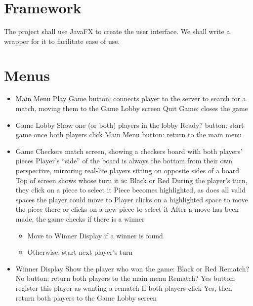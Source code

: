 \documentclass{scrreprt}
\begin{document}
\section{Framework}

The project shall use JavaFX to create the user interface. We shall write a wrapper for it to facilitate ease of use.

\section{Menus}

\begin{itemize}
\item Main Menu
    \subitem Play Game button: connects player to the server to search for a match, moving them to the Game Lobby screen
    \subitem Quit Game: closes the game

\item Game Lobby
    \subitem Show one (or both) players in the lobby
    \subitem Ready? button: start game once both players click
    \subitem Main Menu button: return to the main menu

\item Game
    \subitem Checkers match screen, showing a checkers board with both players’ pieces
        \subsubitem Player’s “side” of the board is always the bottom from their own perspective, mirroring real-life players sitting on opposite sides of a board
    \subitem Top of screen shows whose turn it is: Black or Red
        \subsubitem During the player’s turn, they click on a piece to select it
        \subsubitem Piece becomes highlighted, as does all valid spaces the player could move to
        \subsubitem Player clicks on a highlighted space to move the piece there or clicks on a new piece to select it
        \subsubitem After a move has been made, the game checks if there is a winner
        \subsubitem \begin{itemize}
            \item Move to Winner Display if a winner is found
            \item Otherwise, start next player’s turn
        \end{itemize}

\item Winner Display
    \subitem Show the player who won the game: Black or Red
    \subitem Rematch? No button: return both players to the main menu
    \subitem Rematch? Yes button: register this player as wanting a rematch
        \subsubitem If both players click Yes, then return both players to the Game Lobby screen
\end{itemize}
\end{document}
